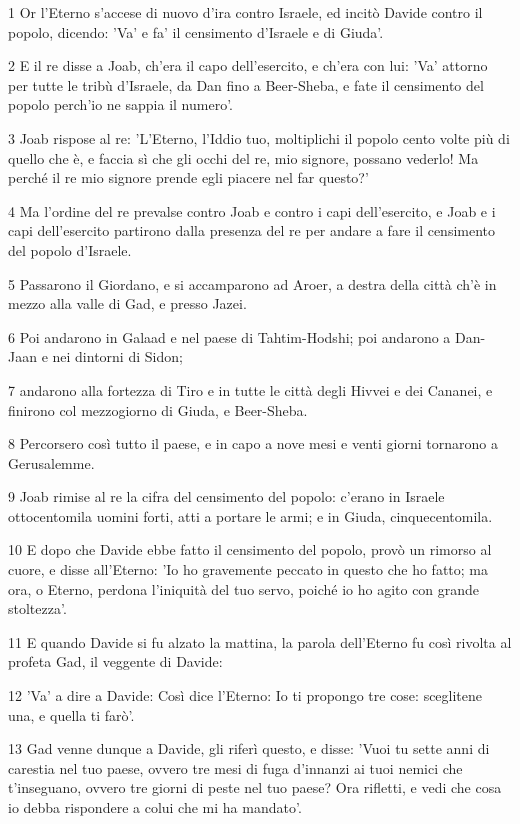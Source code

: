 \par 1 Or l'Eterno s'accese di nuovo d'ira contro Israele, ed incitò Davide contro il popolo, dicendo: 'Va' e fa' il censimento d'Israele e di Giuda'.
\par 2 E il re disse a Joab, ch'era il capo dell'esercito, e ch'era con lui: 'Va' attorno per tutte le tribù d'Israele, da Dan fino a Beer-Sheba, e fate il censimento del popolo perch'io ne sappia il numero'.
\par 3 Joab rispose al re: 'L'Eterno, l'Iddio tuo, moltiplichi il popolo cento volte più di quello che è, e faccia sì che gli occhi del re, mio signore, possano vederlo! Ma perché il re mio signore prende egli piacere nel far questo?'
\par 4 Ma l'ordine del re prevalse contro Joab e contro i capi dell'esercito, e Joab e i capi dell'esercito partirono dalla presenza del re per andare a fare il censimento del popolo d'Israele.
\par 5 Passarono il Giordano, e si accamparono ad Aroer, a destra della città ch'è in mezzo alla valle di Gad, e presso Jazei.
\par 6 Poi andarono in Galaad e nel paese di Tahtim-Hodshi; poi andarono a Dan-Jaan e nei dintorni di Sidon;
\par 7 andarono alla fortezza di Tiro e in tutte le città degli Hivvei e dei Cananei, e finirono col mezzogiorno di Giuda, e Beer-Sheba.
\par 8 Percorsero così tutto il paese, e in capo a nove mesi e venti giorni tornarono a Gerusalemme.
\par 9 Joab rimise al re la cifra del censimento del popolo: c'erano in Israele ottocentomila uomini forti, atti a portare le armi; e in Giuda, cinquecentomila.
\par 10 E dopo che Davide ebbe fatto il censimento del popolo, provò un rimorso al cuore, e disse all'Eterno: 'Io ho gravemente peccato in questo che ho fatto; ma ora, o Eterno, perdona l'iniquità del tuo servo, poiché io ho agito con grande stoltezza'.
\par 11 E quando Davide si fu alzato la mattina, la parola dell'Eterno fu così rivolta al profeta Gad, il veggente di Davide:
\par 12 'Va' a dire a Davide: Così dice l'Eterno: Io ti propongo tre cose: sceglitene una, e quella ti farò'.
\par 13 Gad venne dunque a Davide, gli riferì questo, e disse: 'Vuoi tu sette anni di carestia nel tuo paese, ovvero tre mesi di fuga d'innanzi ai tuoi nemici che t'inseguano, ovvero tre giorni di peste nel tuo paese? Ora rifletti, e vedi che cosa io debba rispondere a colui che mi ha mandato'.

